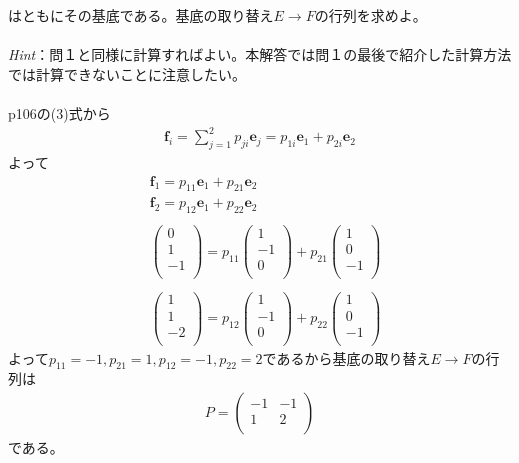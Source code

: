 \documentclass[dvipdfmx,uplatex,11pt]{jsarticle}
\begin{document}
はともにその基底である。基底の取り替え$E→Fの行列を求めよ。$\\ \\
\textsl{Hint}：問１と同様に計算すればよい。本解答では問１の最後で紹介した計算方法では計算できないことに注意したい。\\ \\
p106の(3)式から
\begin{eqnarray*}
\bm{f}_i=\sum^{2}_{j=1}p_{ji}\bm{e}_{j}=p_{1i}\bm{e}_1+p_{2i}\bm{e}_2
\end{eqnarray*}
よって
\begin{eqnarray*}
& \bm{f}_1=p_{11}\bm{e}_1+p_{21}\bm{e}_2 \\
& \bm{f}_2=p_{12}\bm{e}_1+p_{22}\bm{e}_2 \\ \\
&
\begin{pmatrix}
0 \\
1 \\
-1 \\
\end{pmatrix}
=
p_{11}
\begin{pmatrix}
1 \\
-1 \\
0 \\
\end{pmatrix}
+p_{21}
\begin{pmatrix}
1 \\
0 \\
-1 \\
\end{pmatrix}
\\ \\
&
\begin{pmatrix}
1 \\
1 \\
-2 \\
\end{pmatrix}
=
p_{12}
\begin{pmatrix}
1 \\
-1 \\
0 \\
\end{pmatrix}
+p_{22}
\begin{pmatrix}
1 \\
0 \\
-1 \\
\end{pmatrix}
\end{eqnarray*}
よって$p_{11}=-1,p_{21}=1,p_{12}=-1,p_{22}=2$であるから基底の取り替え$E→F$の行列は
\begin{eqnarray*}
P=
\begin{pmatrix}
-1 & -1 \\
1 & 2 \\
\end{pmatrix}
\end{eqnarray*}
である。
%
%
%
\newpage
%
%
%
\end{document}
